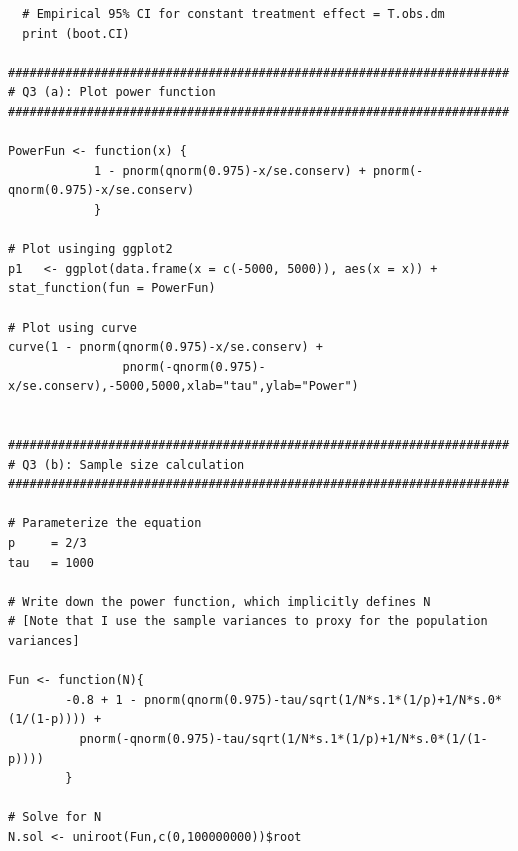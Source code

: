 \documentclass[12pt]{article}
\begin{document}
\begin{verbatim}
  # Empirical 95% CI for constant treatment effect = T.obs.dm
  print (boot.CI)

######################################################################
# Q3 (a): Plot power function
######################################################################

PowerFun <- function(x) {
            1 - pnorm(qnorm(0.975)-x/se.conserv) + pnorm(-qnorm(0.975)-x/se.conserv)
            }

# Plot usinging ggplot2
p1   <- ggplot(data.frame(x = c(-5000, 5000)), aes(x = x)) + stat_function(fun = PowerFun)

# Plot using curve
curve(1 - pnorm(qnorm(0.975)-x/se.conserv) + 
                pnorm(-qnorm(0.975)-x/se.conserv),-5000,5000,xlab="tau",ylab="Power")


######################################################################
# Q3 (b): Sample size calculation
######################################################################

# Parameterize the equation
p     = 2/3
tau   = 1000

# Write down the power function, which implicitly defines N
# [Note that I use the sample variances to proxy for the population variances]

Fun <- function(N){
        -0.8 + 1 - pnorm(qnorm(0.975)-tau/sqrt(1/N*s.1*(1/p)+1/N*s.0*(1/(1-p)))) +
          pnorm(-qnorm(0.975)-tau/sqrt(1/N*s.1*(1/p)+1/N*s.0*(1/(1-p)))) 
        }

# Solve for N
N.sol <- uniroot(Fun,c(0,100000000))$root
\end{verbatim}
\end{document}
